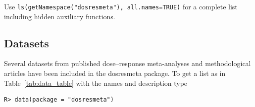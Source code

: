\documentclass[11pt,a4paper,twoside,openany]{book}\usepackage{knitr}
\newcommand{\pkg}[1]{{\fontseries{b}\selectfont #1}}
\begin{document}
{{\noindent Use \texttt{ls(getNamespace("dosresmeta"), all.names=TRUE)} for a complete list including hidden auxiliary functions.

\subsection{Datasets}

\noindent Several datasets from published dose--response meta-analyses and methodological articles have been included in the \pkg{dosresmeta} package. To get a list as in Table~\ref{tab:data_table} with the names and description type

\begin{knitrout}\footnotesize
{}\color{fgcolor}\begin{kframe}
\begin{verbatim}
R> data(package = "dosresmeta")
\end{verbatim}
\end{kframe}
\end{knitrout}

\begin{knitrout}\footnotesize
{}\color{fgcolor}\begin{table}


\end{table}
\end{knitrout}}}
\end{document}
